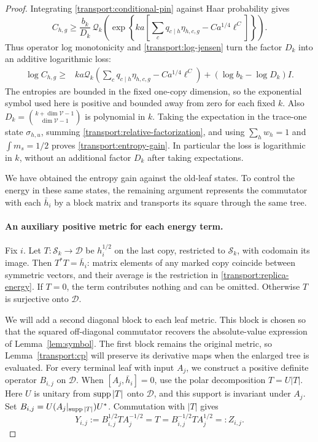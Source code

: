 \begin{proof}
Integrating \eqref{transport:conditional-pin} against Haar probability
gives
\[
 C_{h,g}\ge\frac{b_k}{D_k}\,
 \mathcal Q_k\!\left(\exp\!\left\{ka\left[
    \sum_cq_{c\mid h}\eta_{h,c,g}
                    -C a^{1/4}\ell^C\right]\right\}\right).
\]
Thus operator log monotonicity and \eqref{transport:log-jensen} turn
the factor $D_k$ into an additive logarithmic loss:
\begin{align}\label{transport:log-relative}
 \log C_{h,g}\geq{}&ka\mathcal Q_k\!\left(
       \sum_cq_{c\mid h}\eta_{h,c,g}-C a^{1/4}\ell^C\right)
       +(\log b_k-\log D_k)I.
\end{align}
The entropies are bounded in the fixed one-copy dimension, so the
exponential symbol used here is positive and bounded away from zero
for each fixed $k$.  Also
$D_k=\binom{k+\dim\mathcal V-1}{\dim\mathcal V-1}$ is polynomial in
$k$.  Taking the expectation in the trace-one state $\sigma_{h,u}$,
summing \eqref{transport:relative-factorization}, and using
$\sum_hw_h=1$ and $\int m_s=1/2$ proves
\eqref{transport:entropy-gain}.  In particular the loss is logarithmic
in $k$, without an additional factor $D_k$ after taking expectations.

We have obtained the entropy gain against the old-leaf states.  To
control the energy in these same states, the remaining argument
represents the commutator with each $\bar h_i$ by a block matrix and
transports its square through the same tree.

\paragraph{An auxiliary positive metric for each energy term.}
Fix $i$.  Let $T:\mathcal S_k\longrightarrow\mathcal D$ be
$h_i^{1/2}$ on the last copy, restricted to $\mathcal S_k$, with
codomain its image.  Then
$T^*T=\bar h_i$: matrix elements of any marked copy coincide between
symmetric vectors, and their average is the restriction in
\eqref{transport:replica-energy}.  If $T=0$, the term contributes
nothing and can be omitted.  Otherwise $T$ is surjective onto
$\mathcal D$.

We will add a second diagonal block to each leaf metric.  This block
is chosen so that the squared off-diagonal commutator recovers the
absolute-value expression of Lemma~\ref{lem:symbol}.  The first block
remains the original metric, so Lemma~\ref{transport:cp} will preserve
its derivative maps when the enlarged tree is evaluated.
For every terminal leaf with input $A_j$, we construct a positive
definite operator $B_{i,j}$ on $\mathcal D$.  When
$[A_j,\bar h_i]=0$, use the polar decomposition $T=U|T|$.
Here $U$ is unitary from $\operatorname{supp}|T|$ onto $\mathcal D$, and this support
is invariant under $A_j$.  Set
$B_{i,j}=U(A_j|_{\operatorname{supp}|T|})U^*$.  Commutation with $|T|$ gives
\begin{equation}\label{transport:unsplit-block}
 Y_{i,j}:=B_{i,j}^{1/2}TA_j^{-1/2}=T
 =B_{i,j}^{-1/2}TA_j^{1/2}=:Z_{i,j}.
\end{equation}


\end{proof}
